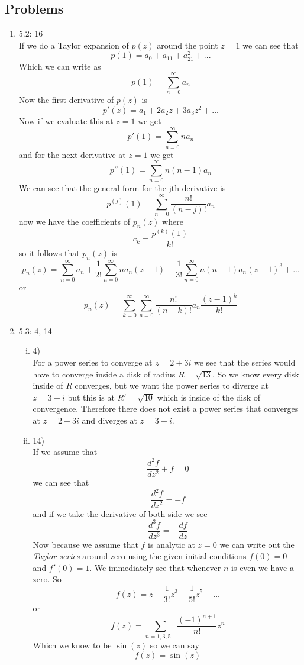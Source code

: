\documentclass[11pt]{article}
\begin{document}
\subsection*{Problems}

\begin{enumerate}
\item 5.2: 16\\
If we do a Taylor expansion of $p(z)$ around the point $z=1$ we can see that
$$p(1) = a_0+a_11+a_21^2+...$$
Which we can write as
$$p(1) = \sum_{n=0}^{\infty}a_n$$
Now the first derivative of $p(z)$ is 
$$p'(z) = a_1+2a_2z+3a_3z^2+...$$
Now if we evaluate this at $z=1$ we get
$$p'(1) = \sum_{n=0}^{\infty}na_n$$
and for the next derivative at $z=1$ we get
$$p''(1) = \sum_{n=0}^{\infty}n(n-1)a_n$$
We can see that the general form for the jth derivative is 
$$p^{(j)}(1) = \sum_{n=0}^{\infty}\frac{n!}{(n-j)!}a_n$$
now we have the coefficients of $p_n(z)$ where
$$c_k = \frac{p^{(k)}(1)}{k!}$$
so it follows that $p_n(z)$ is
$$p_n(z) = \sum_{n=0}^{\infty}a_n + \frac{1}{2!}\sum_{n=0}^{\infty}na_n(z-1) + \frac{1}{3!}\sum_{n=0}^{\infty}n(n-1)a_n(z-1)^3 + ...$$
or 
$$p_n(z) = \sum_{k=0}^{\infty}\sum_{n=0}^{\infty}\frac{n!}{(n-k)!}a_n\frac{(z-1)^k}{k!}$$

\item 5.3: 4, 14
\begin{enumerate}[(i)]
\item 4)\\
For a power series to converge at $z = 2+3i$ we see that the series would have to converge inside a disk of radius $R=\sqrt{13}$. So we know every disk inside of $R$ converges, but we want the power series to diverge at $z=3-i$ but this is at $R' = \sqrt{10}$ which is inside of the disk of convergence. Therefore there does not exist a power series that converges at $z = 2+3i$ and diverges at $z=3-i$.

\item 14)\\
If we assume that
$$\frac{d^2 f}{dz^2}+f=0$$
we can see that 
$$\frac{d^2 f}{dz^2}=-f$$
and if we take the derivative of both side we see
$$\frac{d^3 f}{dz^3}=-\frac{d f}{dz}$$
Now because we assume that $f$ is analytic at $z=0$ we can write out the \emph{Taylor series} around zero using the given initial conditions $f(0)=0$ and $f'(0)=1$. We immediately see that whenever $n$ is even we have a zero. So
$$f(z) = z-\frac{1}{3!}z^3+\frac{1}{5!}z^5+...$$
or
$$f(z) = \sum_{n=1,3,5...}\frac{(-1)^{n+1}}{n!}z^n$$
Which we know to be $\sin(z)$ so we can say
$$f(z) = \sin(z)$$


\end{enumerate}
\end{enumerate}
\end{document}
